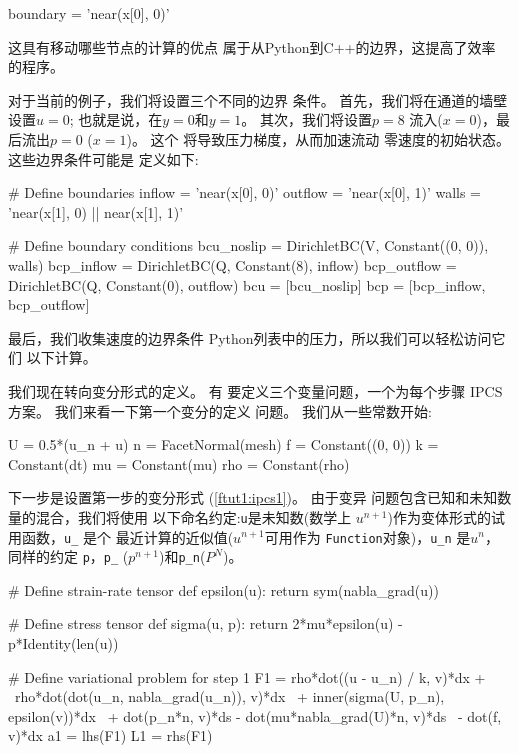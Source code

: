 \begin{python}
boundary = 'near(x[0], 0)'
\end{python}
这具有移动哪些节点的计算的优点
属于从Python到C++的边界，这提高了效率
的程序。

对于当前的例子，我们将设置三个不同的边界
条件。 首先，我们将在通道的墙壁设置$u = 0$;
也就是说，在$y = 0$和$y = 1$。 其次，我们将设置$p = 8$
流入($x = 0$)，最后流出$p = 0$ ($x = 1$)。 这个
将导致压力梯度，从而加速流动
零速度的初始状态。 这些边界条件可能是
定义如下:

\begin{python}
# Define boundaries
inflow   = 'near(x[0], 0)'
outflow  = 'near(x[0], 1)'
walls    = 'near(x[1], 0) || near(x[1], 1)'

# Define boundary conditions
bcu_noslip  = DirichletBC(V, Constant((0, 0)), walls)
bcp_inflow  = DirichletBC(Q, Constant(8), inflow)
bcp_outflow = DirichletBC(Q, Constant(0), outflow)
bcu = [bcu_noslip]
bcp = [bcp_inflow, bcp_outflow]
\end{python}

最后，我们收集速度的边界条件
Python列表中的压力，所以我们可以轻松访问它们
以下计算。

我们现在转向变分形式的定义。 有
要定义三个变量问题，一个为每个步骤
IPCS方案。 我们来看一下第一个变分的定义
问题。 我们从一些常数开始:

\begin{python}
U   = 0.5*(u_n + u)
n   = FacetNormal(mesh)
f   = Constant((0, 0))
k   = Constant(dt)
mu  = Constant(mu)
rho = Constant(rho)
\end{python}

下一步是设置第一步的变分形式
(\ref{ftut1:ipcs1})。 由于变异
问题包含已知和未知数量的混合，我们将使用
以下命名约定:\texttt{u}是未知数(数学上
$u^{n+1}$)作为变体形式的试用函数，\verb!u_! 是个
最近计算的近似值($u^{n+1}$可用作为
\texttt{Function}对象)，\verb!u_n! 是$u^n$，同样的约定
\texttt{p}，\verb!p_! ($p^{n+1}$)和\verb!p_n!($P^N$)。

\begin{python}
# Define strain-rate tensor
def epsilon(u):
    return sym(nabla_grad(u))

# Define stress tensor
def sigma(u, p):
    return 2*mu*epsilon(u) - p*Identity(len(u))

# Define variational problem for step 1
F1 = rho*dot((u - u_n) / k, v)*dx + \
     rho*dot(dot(u_n, nabla_grad(u_n)), v)*dx \
   + inner(sigma(U, p_n), epsilon(v))*dx \
   + dot(p_n*n, v)*ds - dot(mu*nabla_grad(U)*n, v)*ds \
   - dot(f, v)*dx
a1 = lhs(F1)
L1 = rhs(F1)
\end{python}


